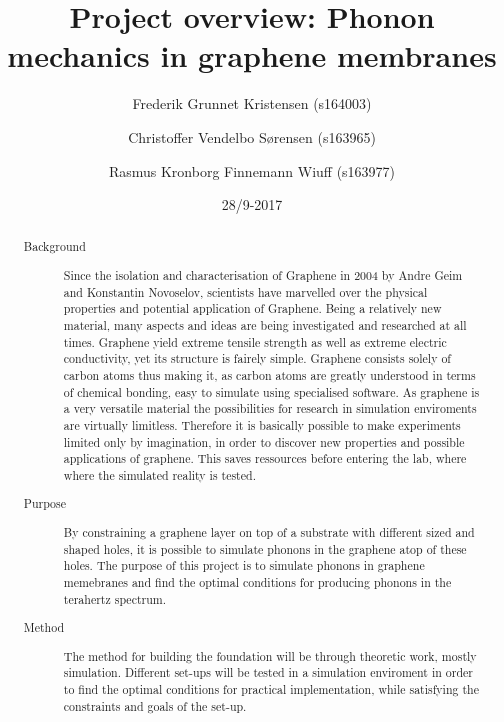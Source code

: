 




\title{Project overview: Phonon mechanics in graphene membranes}
\date{28/9-2017}
\author{Frederik Grunnet Kristensen (s164003)}
\author{Christoffer Vendelbo Sørensen (s163965)}
\author{Rasmus Kronborg Finnemann Wiuff (s163977)}

\begin{abstract}
  \begin{description}
    \item[Background] Since the isolation and characterisation of Graphene in 2004 by Andre Geim and Konstantin Novoselov, scientists have marvelled over the physical properties and potential application of Graphene. Being a relatively new material, many aspects and ideas are being investigated and researched at all times. Graphene yield extreme tensile strength as well as extreme electric conductivity, yet its structure is fairely simple.
    Graphene consists solely of carbon atoms thus making it, as carbon atoms are greatly understood in terms of chemical bonding, easy to simulate using specialised software.
    As graphene is a very versatile material the possibilities for research in simulation enviroments are virtually limitless. Therefore it is basically possible to make experiments limited only by imagination, in order to discover new properties and possible applications of graphene. This saves ressources before entering the lab, where where the simulated reality is tested.
    \item[Purpose] By constraining a graphene layer on top of a substrate with different sized and shaped holes, it is possible to simulate phonons in the graphene atop of these holes. The purpose of this project is to simulate phonons in graphene memebranes and find the optimal conditions for producing phonons in the terahertz spectrum.
    \item[Method] The method for building the foundation will be through theoretic work, mostly simulation. Different set-ups will be tested in a simulation enviroment in order to find the optimal conditions for practical implementation, while satisfying the constraints and goals of the set-up.
  \end{description}
\end{abstract}


\maketitle


\thispagestyle{empty}
\setcounter{page}{1}





